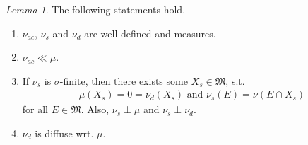 \documentclass[10pt, leqno]{amsart}
\theoremstyle{definition}
\theoremstyle{remark}
\newtheorem{lemma}[theorem]{Lemma}
\begin{document}
    \begin{lemma} \label{lem:auxiliary_functions_lemma}
        The following statements hold.
        \begin{enumerate}[label=(\roman*), wide]
            \item \label{lem:auxiliary_functions_lemma_1} \(\nu_{ac}\), \(\nu_s\) and \(\nu_d\) are well-defined and measures.
            \item \label{lem:auxiliary_functions_lemma_2} \(\nu_{ac} \ll \mu\).
            \item \label{lem:auxiliary_functions_lemma_3} If \(\nu_s\) is \(\sigma\)-finite, then there exists some \(X_s \in \mathfrak{M}\), s.t.
            \begin{align}
                \mu(X_s) = 0 = \nu_d(X_s) \text{ and } \nu_s(E) = \nu(E \cap X_s)
            \end{align}
            for all \(E \in \mathfrak{M}\). Also, \(\nu_s \perp \mu\) and \(\nu_s \perp \nu_d\).
            \item \label{lem:auxiliary_functions_lemma_4} \(\nu_{d}\) is diffuse wrt. \(\mu\).
        \end{enumerate}
    \end{lemma}
\end{document}
